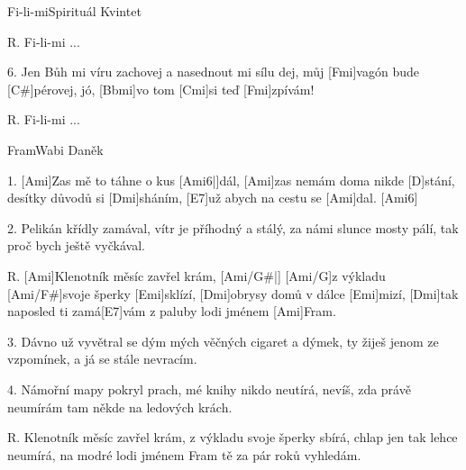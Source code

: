 \begin{song}{Fi-li-mi}{Spirituál Kvintet}
\begin{xverse}{R. }
Fi-li-mi ...
\end{xverse}

\begin{xverse}{6. }
Jen Bůh mi víru zachovej a nasednout mi sílu dej,
můj [Fmi]vagón bude [C#]pérovej,
jó, [Bbmi]vo tom [Cmi]si teď [Fmi]zpívám!
\end{xverse}

\begin{xverse}{R. }
Fi-li-mi ...
\end{xverse}

\end{song}

\begin{song}{Fram}{Wabi Daněk}

\begin{xverse}{1. }
[Ami]Zas mě to táhne o kus [Ami6|]{dál,} [Ami]{zas} nemám doma nikde [D]stání,
desítky důvodů si [Dmi]sháním, [E7]už abych na cestu se [Ami]dal. [Ami6]{}
\end{xverse}

\begin{xverse}{2. }
Pelikán křídly zamával, vítr je příhodný a stálý,
za námi slunce mosty pálí, tak proč bych ještě vyčkával.
\end{xverse}

\begin{xverse}{R. }
[Ami]Klenotník měsíc zavřel krám, [Ami/G#|]{} [Ami/G]{z vý}kladu [Ami/F#]svoje šperky [Emi]sklízí,
[Dmi]obrysy domů v dálce [Emi]mizí, [Dmi]tak naposled ti zamá[E7]vám
z paluby lodi jménem [Ami]Fram.
\end{xverse}

\begin{xverse}{3. }
Dávno už vyvětral se dým mých věčných cigaret a dýmek,
ty žiješ jenom ze vzpomínek, a já se stále nevracím.
\end{xverse}

\begin{xverse}{4. }
Námořní mapy pokryl prach, mé knihy nikdo neutírá,
nevíš, zda právě neumírám tam někde na ledových krách.
\end{xverse}

\begin{xverse}{R. }
Klenotník měsíc zavřel krám, z výkladu svoje šperky sbírá,
chlap jen tak lehce neumírá, na modré lodi jménem Fram
tě za pár roků vyhledám.
\end{xverse}

\end{song}
\chords{ \chordAmiSix \chordAmiGis \chordAmiG \chordAmiFis }

